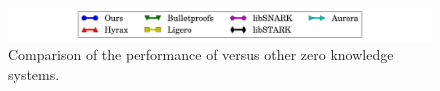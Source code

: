 \begin{figure}[htbp]
%
%
\quad
\centering
\includegraphics[width = 6.5in]{legend.pdf}
\caption{\label{ZKGKR}Comparison of the performance of \name{} versus other zero knowledge systems.}
\end{figure}

